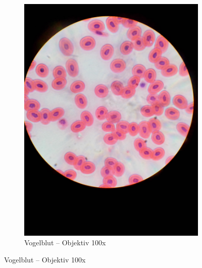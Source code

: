 \begin{figure}[h!]
\begin{subfigure}[b]{0.3\textwidth}
		\includegraphics[width=1\textwidth]{../images/01_frog_blood.jpg}
		\caption{Vogelblut -- Objektiv 100x}
	\end{subfigure}


\end{figure}
